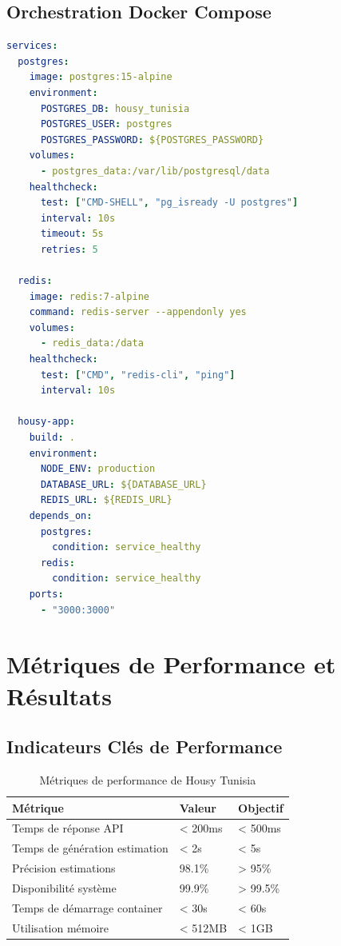 \subsection{Orchestration Docker Compose}

\begin{lstlisting}[language=yaml, caption=Configuration Docker Compose production]
services:
  postgres:
    image: postgres:15-alpine
    environment:
      POSTGRES_DB: housy_tunisia
      POSTGRES_USER: postgres
      POSTGRES_PASSWORD: ${POSTGRES_PASSWORD}
    volumes:
      - postgres_data:/var/lib/postgresql/data
    healthcheck:
      test: ["CMD-SHELL", "pg_isready -U postgres"]
      interval: 10s
      timeout: 5s
      retries: 5

  redis:
    image: redis:7-alpine
    command: redis-server --appendonly yes
    volumes:
      - redis_data:/data
    healthcheck:
      test: ["CMD", "redis-cli", "ping"]
      interval: 10s

  housy-app:
    build: .
    environment:
      NODE_ENV: production
      DATABASE_URL: ${DATABASE_URL}
      REDIS_URL: ${REDIS_URL}
    depends_on:
      postgres:
        condition: service_healthy
      redis:
        condition: service_healthy
    ports:
      - "3000:3000"
\end{lstlisting}


\section{Métriques de Performance et Résultats}

\subsection{Indicateurs Clés de Performance}

\begin{table}[H]
\centering
\caption{Métriques de performance de Housy Tunisia}
\begin{tabular}{|l|l|l|}
\hline
\textbf{Métrique} & \textbf{Valeur} & \textbf{Objectif} \\
\hline
Temps de réponse API & < 200ms & < 500ms \\
\hline
Temps de génération estimation & < 2s & < 5s \\
\hline
Précision estimations & 98.1\% & > 95\% \\
\hline
Disponibilité système & 99.9\% & > 99.5\% \\
\hline
Temps de démarrage container & < 30s & < 60s \\
\hline
Utilisation mémoire & < 512MB & < 1GB \\
\hline
\end{tabular}
\label{tab:metriques_performance}
\end{table}

